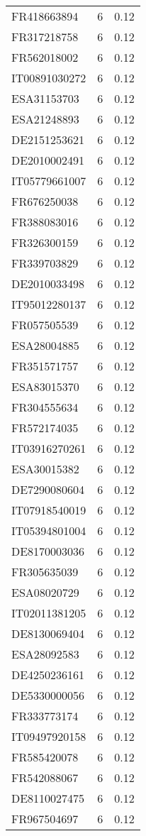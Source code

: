 \begin{table*}[htbp]
\begin{tabular}{lrr}
FR418663894 & 6 & 0.12 \\
FR317218758 & 6 & 0.12 \\
FR562018002 & 6 & 0.12 \\
IT00891030272 & 6 & 0.12 \\
ESA31153703 & 6 & 0.12 \\
ESA21248893 & 6 & 0.12 \\
DE2151253621 & 6 & 0.12 \\
DE2010002491 & 6 & 0.12 \\
IT05779661007 & 6 & 0.12 \\
FR676250038 & 6 & 0.12 \\
FR388083016 & 6 & 0.12 \\
FR326300159 & 6 & 0.12 \\
FR339703829 & 6 & 0.12 \\
DE2010033498 & 6 & 0.12 \\
IT95012280137 & 6 & 0.12 \\
FR057505539 & 6 & 0.12 \\
ESA28004885 & 6 & 0.12 \\
FR351571757 & 6 & 0.12 \\
ESA83015370 & 6 & 0.12 \\
FR304555634 & 6 & 0.12 \\
FR572174035 & 6 & 0.12 \\
IT03916270261 & 6 & 0.12 \\
ESA30015382 & 6 & 0.12 \\
DE7290080604 & 6 & 0.12 \\
IT07918540019 & 6 & 0.12 \\
IT05394801004 & 6 & 0.12 \\
DE8170003036 & 6 & 0.12 \\
FR305635039 & 6 & 0.12 \\
ESA08020729 & 6 & 0.12 \\
IT02011381205 & 6 & 0.12 \\
DE8130069404 & 6 & 0.12 \\
ESA28092583 & 6 & 0.12 \\
DE4250236161 & 6 & 0.12 \\
DE5330000056 & 6 & 0.12 \\
FR333773174 & 6 & 0.12 \\
IT09497920158 & 6 & 0.12 \\
FR585420078 & 6 & 0.12 \\
FR542088067 & 6 & 0.12 \\
DE8110027475 & 6 & 0.12 \\
FR967504697 & 6 & 0.12 \\

\end{tabular}
\end{table*}
